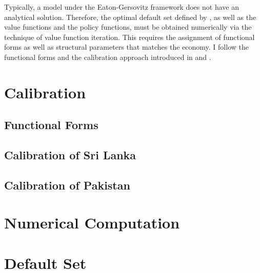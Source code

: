 Typically, a model under the Eaton-Gersovitz framework does not have an analytical solution. Therefore, the optimal default set defined by , as well as the value functions and the policy functions, must be obtained numerically via the technique of value function iteration.
This requires the assignment of functional forms as well as structural parameters that matches the economy.
I follow the functional forms and the calibration approach introduced in \citet{Na-18} and \citet{Hinrichsen_2020-chapter4}.

\section{Calibration}
\label{sec: calibration}

\subsection*{Functional Forms}


\subsection*{Calibration of Sri Lanka}


\subsection*{Calibration of Pakistan}


\section{Numerical Computation}
\label{sec:computation}


\section{Default Set}
